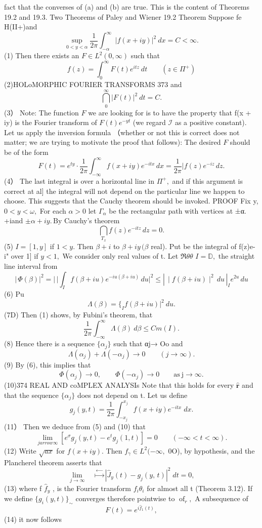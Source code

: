 fact that the converses of (a) and (b) are true. This is the content of Theorems 19.2 and 19.3. Two Theorems of Paley and Wiener 19.2 Theorem Suppose fe H(II+)and $$ \operatorname*{sup}_{0<y<\alpha}\frac{1}{2\pi}\int_{-\alpha}^{\infty}|f(x+i y)|^{2}~d x=C<\infty. $$ (1) Then there exists an $F\in L^{2}(0,\infty)$ such that $$ f(z)=\int_{0}^{\infty}F(t)e^{i t z}~d t\qquad(z\in\Pi^{+}) $$ (2)HOLoMORPHIC FOURIER TRANSFORMS $373$ and $$ \bigcap_{0}^{\infty}|F(t)|^{2}\ d t=C. $$ (3） Note: The function ${\mathbf{}}F$ we are looking for is to have the property that f(x + iy) is the Fourier transform of $F(t)e^{-y t}$ (we regard $\scriptstyle{\mathcal{I}}$ as a positive constant). Let us apply the inversion formula （whether or not this is correct does not matter; we are trying to motivate the proof that follows): The desired ${\mathbf{}}F$ should be of the form $$ F(t)=e^{t y}\cdot{\frac{1}{2\pi}}\int_{-\infty}^{\infty}f(x+i y)e^{-i t x}\,d x={\frac{1}{2\pi}} |f(z)e^{-i z}\,d z. $$ (4） The last integral is over a horizontal line in $\Pi^{+}\!,$ and if this argument is correct at al] the integral will not depend on the particular line we happen to choose. This suggests that the Cauchy theorem should be invoked. PROOF Fix y, $\scriptstyle0<y<\omega,$ For each $\scriptstyle\alpha>0$ let $\Gamma_{\alpha}$ be the rectangular path with vertices at ±α. +iand $\pm\alpha+i y.\,\mathrm{By}$ Cauchy's theorem $$ \bigcap_{T_{x}}f(z)e^{-i t z}\,d z=0. $$ (5) $I=[1,y]$ if $1<y.$ Then $\beta+i$ to $\beta+i y\,(\beta$ real). Put be the integral of f(z)e- i" over 1] if $y<1,$ We consider only real values of t. Let $\Re\theta\theta$ $\scriptstyle I=\mathbb{D},$ the straight line interval from $$ |\,\Phi(\beta)|^{2}=\left|\,\right|\!\int_{I}f(\beta+i u)e^{-i u(\beta+i u)}\,d u |^{2}\leq\left|\,\!\mid\!f(\beta+i u)\!\mid^{2}\,d u\,\right|_{I}e^{2u}\,d u $$ (6) Pu $$ \Lambda(\beta)= \{_{I}f(\beta+i u){\big|}^{2}\ d u. $$ (7D) Then (1) shows, by Fubini's theorem, that $$ {\frac{1}{2\pi}}\int_{-\infty}^{\infty}\Lambda(\beta)\ d\beta\leq C m(I). $$ (8) Hence there is a sequence $\{\alpha_{j}\}$ such that αj→ Oo and $$ \Lambda(\alpha_{j})+\Lambda(-\alpha_{j})\to0\qquad(j\to\infty). $$ (9) By (6), this implies that $$ \Phi(\alpha_{j})\to0,\qquad\Phi(-\alpha_{j})\to0\qquad\mathrm{as~j\to\infty.} $$ (10)374 REAL AND coMPLEX ANALYSIs Note that this holds for every ${\hat{\mathbf{r}}}$ and that the sequence $\{\alpha_{j}\}$ does not depend on t. Let us define $$ g_{j}(y,t)={\frac{1}{2\pi}}\int_{-x_{j}}^{x_{j}}f(x+i y)e^{-i t x}\;d x. $$ (11） Then we deduce from (5) and (10) that $$ \operatorname*{lim}_{j arrow\infty}\left[e^{\sigma}g_{j}(y,t)-e^{t}g_{j}(1,t)\right]=0\qquad(-\infty<t<\infty). $$ (12) Write $\scriptstyle{\sqrt{a x}}$ for $f(x+i y).$ Then $f_{\gamma}\in L^{2}(-\infty,$ 0O), by hypothesis, and the Plancherel theorem asserts that $$ \operatorname*{lim}_{j\to\infty}\;\ \;\;\stackrel{\longleftarrow}{\mapsto}|\hat{J}_{y}(t)-g_{j}(y,\,t)|^{2}\;d t=0, $$ (13) where f ${\hat{f}}_{y}$ , is the Fourier transform $\scriptstyle{f_{i}\theta_{i}}$ for almost all t (Theorem 3.12). If we define $\{g_{i}(y,t)\}_{\sim}$ converges therefore pointwise to $\operatorname{of}_{r},$ A subsequence of $$ F(t)=e^{i\!\!\!{\hat{f}}_{1}(t)}, $$ (14) it now follows 